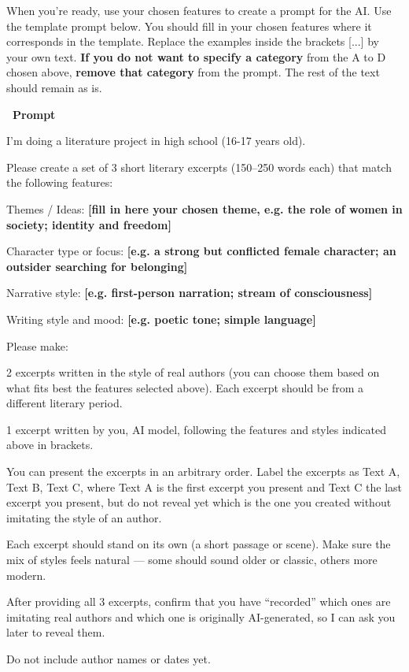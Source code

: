 \documentclass[12pt]{article}
\begin{document}
When you’re ready, use your chosen features to create a prompt for the AI. Use the template prompt below. You should fill in your chosen features where it corresponds in the template. \colorbox{orange!30}{Replace the examples inside the brackets [...] by your own text.} \textbf{If you do not want to specify a category} from the A to D chosen above, \textbf{remove that category} from the prompt. \colorbox{orange!30}{The rest of the text should remain as is.}


\vspace{0.3cm}
\textcolor{maincolor}{\textbf{\faCopy\ Prompt}}
\begin{promptbox}
I’m doing a literature project in high school (16-17 years old).

Please create a set of 3 short literary excerpts (150–250 words each) that match the following features:

Themes / Ideas: \textbf{[fill in here your chosen theme, e.g. the role of women in society; identity and freedom]}

Character type or focus: \textbf{[e.g. a strong but conflicted female character; an outsider searching for belonging]}

Narrative style: \textbf{[e.g. first-person narration; stream of consciousness]}

Writing style and mood: \textbf{[e.g. poetic tone; simple language]}

Please make:

2 excerpts written in the style of real authors (you can choose them based on what fits best the features selected above). Each excerpt should be from a different literary period.

1 excerpt written by you, AI model, following the features and styles indicated above in brackets.

You can present the excerpts in an arbitrary order. Label the excerpts as Text A, Text B, Text C, where Text A is the first excerpt you present and Text C the last excerpt you present, but do not reveal yet which is the one you created without imitating the style of an author.

Each excerpt should stand on its own (a short passage or scene). Make sure the mix of styles feels natural — some should sound older or classic, others more modern.

After providing all 3 excerpts, confirm that you have “recorded” which ones are imitating real authors and which one is originally AI-generated, so I can ask you later to reveal them.

Do not include author names or dates yet.
\end{promptbox}
\end{document}
